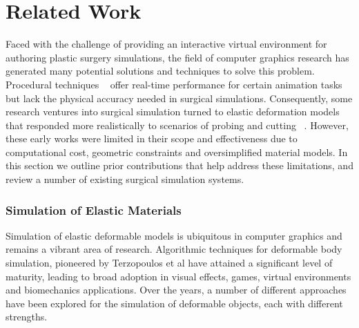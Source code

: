 


\chapter{Related Work}

Faced with the challenge of providing an interactive virtual
environment for authoring plastic surgery simulations, the field of
computer graphics research has generated many potential solutions and
techniques to solve this problem. Procedural techniques
~\citep{JoshiMDGS:2007,WangP:2002,KavanCZO:2008,VaillBGCRWGP:2013} offer real-time
performance for certain animation tasks but lack the physical accuracy
needed in surgical simulations. Consequently, some research ventures
into surgical simulation turned to elastic deformation models
~\citep{TerzoPBF:1987} that responded more realistically to scenarios of
probing and cutting ~\citep{BroC:1996,MendoL:2003,NienhS:2001}. However,
these early works were limited in their scope and effectiveness due to
computational cost, geometric constraints and oversimplified material
models. In this section we outline prior contributions that help
address these limitations, and review a number of existing surgical
simulation systems.

\subsection{Simulation of Elastic Materials}

Simulation of elastic deformable models is ubiquitous in computer
graphics and remains a vibrant area of research. Algorithmic
techniques for deformable body simulation, pioneered by Terzopoulos et
al  have attained a significant level of
maturity, leading to broad adoption in visual effects, games, virtual
environments and biomechanics applications. Over the years, a number
of different approaches have been explored for the simulation of
deformable objects, each with different strengths. 

